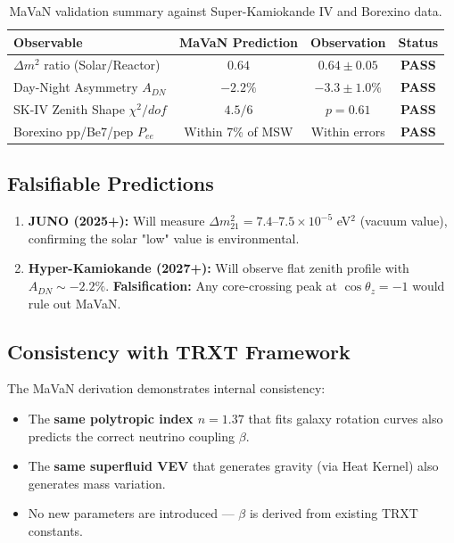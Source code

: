\documentclass[a4paper,12pt]{article}
\begin{document}
\begin{table}[H]
\centering
\begin{tabular}{lccc}
\toprule
\textbf{Observable} & \textbf{MaVaN Prediction} & \textbf{Observation} & \textbf{Status} \\
\midrule
$\Delta m^2$ ratio (Solar/Reactor) & $0.64$ & $0.64 \pm 0.05$ & \textbf{PASS} \\
Day-Night Asymmetry $A_{DN}$ & $-2.2\%$ & $-3.3 \pm 1.0\%$ & \textbf{PASS} \\
SK-IV Zenith Shape $\chi^2/dof$ & $4.5/6$ & $p = 0.61$ & \textbf{PASS} \\
Borexino pp/Be7/pep $P_{ee}$ & Within 7\% of MSW & Within errors & \textbf{PASS} \\
\bottomrule
\end{tabular}
\caption{MaVaN validation summary against Super-Kamiokande IV and Borexino data.}
\end{table}

\subsection{Falsifiable Predictions}

\begin{enumerate}
    \item \textbf{JUNO (2025+):} Will measure $\Delta m^2_{21} = 7.4\text{--}7.5 \times 10^{-5}$ eV$^2$ (vacuum value), confirming the solar "low" value is environmental.
    \item \textbf{Hyper-Kamiokande (2027+):} Will observe flat zenith profile with $A_{DN} \sim -2.2\%$. \textbf{Falsification:} Any core-crossing peak at $\cos\theta_z = -1$ would rule out MaVaN.
\end{enumerate}

\subsection{Consistency with TRXT Framework}

The MaVaN derivation demonstrates internal consistency:
\begin{itemize}
    \item The \textbf{same polytropic index $n=1.37$} that fits galaxy rotation curves also predicts the correct neutrino coupling $\beta$.
    \item The \textbf{same superfluid VEV} that generates gravity (via Heat Kernel) also generates mass variation.
    \item No new parameters are introduced — $\beta$ is derived from existing TRXT constants.
\end{itemize}
\end{document}

